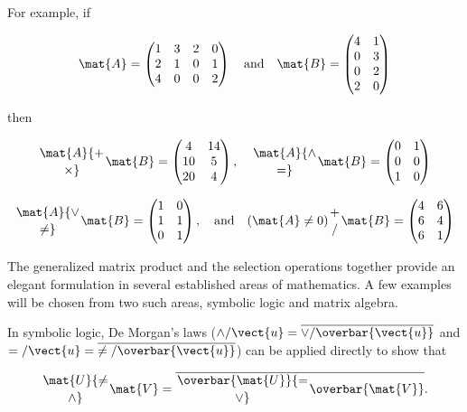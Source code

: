\noindent For example, if

$$
  \mat{A} = \begin{pmatrix}
    1&3&2&0 \\
    2&1&0&1 \\
    4&0&0&2
  \end{pmatrix} \quad\text{and}\quad \mat{B} = \begin{pmatrix}
    4&1 \\
    0&3 \\
    0&2 \\
    2&0
  \end{pmatrix}
$$

\noindent then

$$
  \mat{A} {+ \atop \times} \mat{B} = \begin{pmatrix}
     4&14 \\
    10& 5 \\
    20& 4
  \end{pmatrix}, \quad
  \mat{A} {\wedge \atop =} \mat{B} = \begin{pmatrix}
    0&1 \\
    0&0 \\
    1&0
  \end{pmatrix}
$$

$$
  \mat{A} {\vee \atop \neq} \mat{B} = \begin{pmatrix}
    1&0 \\
    1&1 \\
    0&1
  \end{pmatrix}, \quad\text{and}\quad
  (\mat{A} \neq 0) {+ \atop /} \mat{B} = \begin{pmatrix} 
    4&6 \\
    6&4 \\
    6&1
  \end{pmatrix}
$$

\par The generalized matrix product and the selection operations together provide an elegant formulation in several established areas of mathematics. A few examples will be chosen from two such areas, symbolic logic and matrix algebra.

\par In symbolic logic, De Morgan's laws ($\wedge/\vect{u} = \overline{\vee/\overbar{\vect{u}}}$ and $=/\vect{u} = \overline{\neq/\overbar{\vect{u}}}$) can be applied directly to show that

$$
  \mat{U} {\neq \atop \wedge} \mat{V} = \overline{\overbar{\mat{U}} {= \atop \vee} \overbar{\mat{V}}}.
$$

